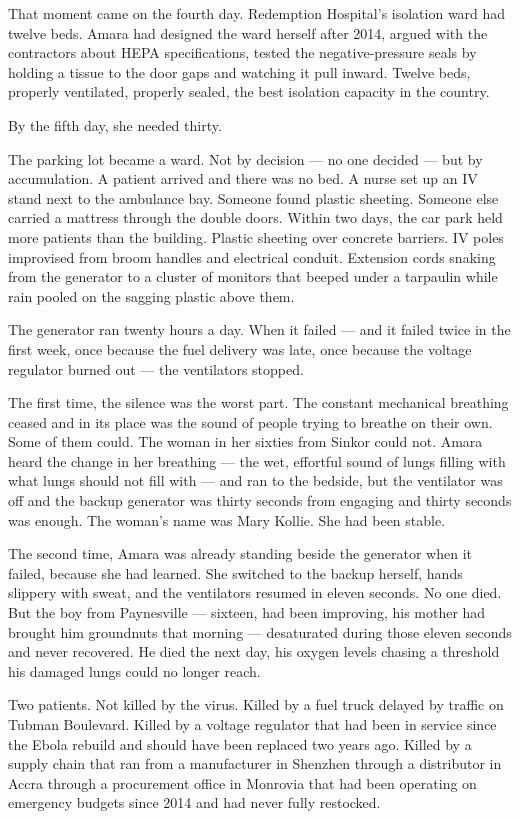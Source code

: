 That moment came on the fourth day. Redemption Hospital's isolation ward had twelve beds. Amara had designed the ward herself after 2014, argued with the contractors about HEPA specifications, tested the negative-pressure seals by holding a tissue to the door gaps and watching it pull inward. Twelve beds, properly ventilated, properly sealed, the best isolation capacity in the country.

By the fifth day, she needed thirty.

The parking lot became a ward. Not by decision --- no one decided --- but by accumulation. A patient arrived and there was no bed. A nurse set up an IV stand next to the ambulance bay. Someone found plastic sheeting. Someone else carried a mattress through the double doors. Within two days, the car park held more patients than the building. Plastic sheeting over concrete barriers. IV poles improvised from broom handles and electrical conduit. Extension cords snaking from the generator to a cluster of monitors that beeped under a tarpaulin while rain pooled on the sagging plastic above them.

The generator ran twenty hours a day. When it failed --- and it failed twice in the first week, once because the fuel delivery was late, once because the voltage regulator burned out --- the ventilators stopped.

The first time, the silence was the worst part. The constant mechanical breathing ceased and in its place was the sound of people trying to breathe on their own. Some of them could. The woman in her sixties from Sinkor could not. Amara heard the change in her breathing --- the wet, effortful sound of lungs filling with what lungs should not fill with --- and ran to the bedside, but the ventilator was off and the backup generator was thirty seconds from engaging and thirty seconds was enough. The woman's name was Mary Kollie. She had been stable.

The second time, Amara was already standing beside the generator when it failed, because she had learned. She switched to the backup herself, hands slippery with sweat, and the ventilators resumed in eleven seconds. No one died. But the boy from Paynesville --- sixteen, had been improving, his mother had brought him groundnuts that morning --- desaturated during those eleven seconds and never recovered. He died the next day, his oxygen levels chasing a threshold his damaged lungs could no longer reach.

Two patients. Not killed by the virus. Killed by a fuel truck delayed by traffic on Tubman Boulevard. Killed by a voltage regulator that had been in service since the Ebola rebuild and should have been replaced two years ago. Killed by a supply chain that ran from a manufacturer in Shenzhen through a distributor in Accra through a procurement office in Monrovia that had been operating on emergency budgets since 2014 and had never fully restocked.

